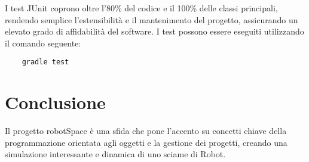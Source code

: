 \documentclass[12pt]{article}
\begin{document}
    \begin{description}[leftmargin=2em]
        \item[Test JUnit:]
    \end{description}

    I test JUnit coprono oltre l'80\% del codice e il 100\% delle classi principali, rendendo semplice l'estensibilità e il mantenimento del progetto, assicurando un elevato grado di affidabilità del software. I test possono essere eseguiti utilizzando il comando seguente:

    \begin{Verbatim}
    gradle test
    \end{Verbatim}

    \section{Conclusione}
    Il progetto robotSpace è una sfida che pone l'accento su concetti chiave della programmazione orientata agli oggetti e la gestione dei progetti, creando una simulazione interessante e dinamica di uno sciame di Robot.
\end{document}
